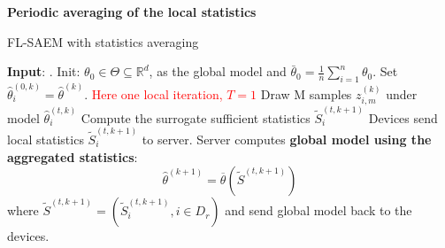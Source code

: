 \documentclass{article}
\begin{document}
\textbf{Periodic averaging of the local statistics}

\begin{algorithm}[H]
\caption{FL-SAEM with statistics averaging} \label{alg:flsaem2}
\begin{algorithmic}[1]
\STATE \textbf{Input}: .
\STATE Init: $\theta_{0} \in \Theta \subseteq \mathbb R^d $, as the global model and $\bar{\theta}_0 =  \frac{1}{n} \sum_{i=1}^n \theta_0$.
\STATE Set $\hat{\theta}^{(0,k)}_i = \hat{\theta}^{(k)}$.
\STATE \textcolor{red}{ Here one local iteration, $T=1$}
\STATE Draw M samples $z_{i,m}^{(k)}$ under model $\hat{\theta}^{(t,k)}_i$
\STATE Compute the surrogate sufficient statistics $\tilde{S}_{i}^{(t,k+1)}$
\ENDFOR
\STATE Devices send local statistics $\tilde{S}_{i}^{(t,k+1)}$ to server.
\ENDFOR
\STATE Server computes \textbf{global model using the aggregated statistics}:
$$
\hat{\theta}^{(k+1)} = \overline{\theta}( \tilde{S}^{(t,k+1)}) 
$$
where $\tilde{S}^{(t,k+1)} = (\tilde{S}_i^{(t,k+1)}, i \in D_r)$  and send global model back to the devices. 
\ENDFOR
\end{algorithmic}
\end{algorithm}
\end{document}

